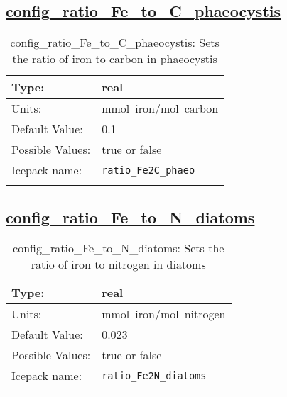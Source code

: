 \subsection[config\_ratio\_Fe\_to\_C\_phaeocystis]{\hyperref[sec:nm_tab_biogeochemistry]{config\_ratio\_Fe\_to\_C\_phaeocystis}}
\label{subsec:nm_sec_config_ratio_Fe_to_C_phaeocystis}
\begin{center}
\begin{longtable}{| p{2.0in} || p{4.0in} |}
    \hline
    Type: & real \\
    \hline
    Units: & \si{mmol.iron/mol.carbon} \\
    \hline
    Default Value: & 0.1 \\
    \hline
    Possible Values: & true or false \\
    \hline
    Icepack name: & \verb+ratio_Fe2C_phaeo+ \\
    \hline
    \caption{config\_ratio\_Fe\_to\_C\_phaeocystis: Sets the ratio of iron to carbon in phaeocystis}
\end{longtable}
\end{center}
\subsection[config\_ratio\_Fe\_to\_N\_diatoms]{\hyperref[sec:nm_tab_biogeochemistry]{config\_ratio\_Fe\_to\_N\_diatoms}}
\label{subsec:nm_sec_config_ratio_Fe_to_N_diatoms}
\begin{center}
\begin{longtable}{| p{2.0in} || p{4.0in} |}
    \hline
    Type: & real \\
    \hline
    Units: & \si{mmol.iron/mol.nitrogen} \\
    \hline
    Default Value: & 0.023 \\
    \hline
    Possible Values: & true or false \\
    \hline
    Icepack name: & \verb+ratio_Fe2N_diatoms+ \\
    \hline
    \caption{config\_ratio\_Fe\_to\_N\_diatoms: Sets the ratio of iron to nitrogen in diatoms}
\end{longtable}
\end{center}

